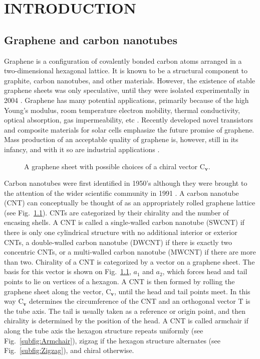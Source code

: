 \chapter{INTRODUCTION} \label{chap:one}

\section{Graphene and carbon nanotubes}

	Graphene is a configuration of covalently bonded carbon atoms arranged in a two-dimensional hexagonal lattice. It is known to be a structural component to graphite, carbon nanotubes, and other materials. However, the existence of stable graphene sheets was only speculative, until they were isolated experimentally in 2004 \cite{Novoselov2004}. Graphene has many potential applications, primarily because of the high Young's modulus, room temperature electron mobility, thermal conductivity, optical absorption, gas impermeability, etc \cite{Novoselov2012}. Recently developed novel transistors \cite{Lin2010} and composite materials for solar cells \cite{Wang2013} emphasize the future promise of graphene. Mass production of an acceptable quality of graphene is, however, still in its infancy, and with it so are industrial applications \cite{Novoselov2012}.
	
	\begin{figure}
		\begin{center}
			\def\svgwidth{.75\columnwidth}
			
		\end{center}		
		\caption{A graphene sheet with possible choices of a chiral vector $\mbox{C}_{\textbf{v}}$.
		\label{fig:GrapheneCat}}
	\end{figure}

	Carbon nanotubes were first identified in 1950's although they were brought to the attention of the wider scientific community in 1991 \cite{Iijima1991}. A carbon nanotube (CNT) can conceptually be thought of as an appropriately rolled graphene lattice (see Fig.~\ref{fig:GrapheneCat}). CNTs are categorized by their chirality and the number of encasing shells. A CNT is called a single-walled carbon nanotube (SWCNT) if there is only one cylindrical structure with no additional interior or exterior CNTs, a double-walled carbon nanotube (DWCNT) if there is exactly two concentric CNTs, or a multi-walled carbon nanotube (MWCNT) if there are more than two. Chirality of a CNT is categorized by a vector on a graphene sheet. The basis for this vector is shown on Fig.~\ref{fig:GrapheneCat}, $a_1$ and $a_2$, which forces head and tail points to lie on vertices of a hexagon. A CNT is then formed by rolling the graphene sheet along the vector, $\mbox{C}_{\textbf{v}}$, until the head and tail points meet. In this way $\mbox{C}_{\textbf{v}}$ determines the circumference of the CNT and an orthogonal vector T is the tube axis. The tail is usually taken as a reference or origin point, and then chirality is determined by the position of the head. 
A CNT is called armchair if along the tube axis the hexagon structure repeats uniformly (see Fig.~\ref{subfig:Armchair}), zigzag if the hexagon structure alternates (see Fig.~\ref{subfig:Zigzag}), and chiral otherwise.
	

